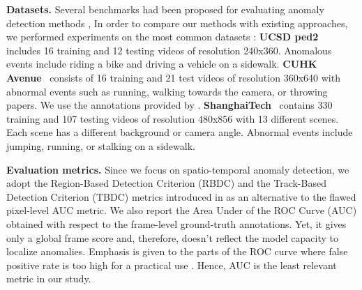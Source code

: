 \documentclass{article}
\begin{document}
\textbf{Datasets.}
Several benchmarks had been proposed for evaluating anomaly detection methods \cite{ped,avenue,shanghaitech,ucfcrime,liu,streetscene,adoc},
In order to compare our methods with existing approaches, we performed experiments on the most common datasets : 
\textbf{UCSD ped2}~\cite{ped} includes 16 training and 12 testing videos of resolution 240x360. Anomalous events include riding a bike and driving a vehicle on a sidewalk.
\textbf{CUHK Avenue}~\cite{avenue} consists of 16 training and 21 test videos of resolution 360x640  with abnormal events such as running, walking towards the camera, or throwing papers. We use the annotations provided by \cite{streetscene}.
\textbf{ShanghaiTech}~\cite{shanghaitech} contains 330 training and 107 testing videos of resolution 480x856 with 13 different scenes. Each scene has a different background or camera angle. Abnormal events include jumping, running, or stalking on a sidewalk.
\vspace{1mm}

\noindent\textbf{Evaluation metrics.} Since we focus on spatio-temporal 
anomaly detection, we
adopt the Region-Based Detection Criterion (RBDC)
and the Track-Based Detection Criterion (TBDC) 
metrics
introduced in
\cite{streetscene} as an alternative to the flawed pixel-level AUC metric. 
We also report the Area Under of the ROC Curve (AUC) obtained with respect to the frame-level ground-truth annotations. 
Yet, it gives only a global frame score and, therefore, doesn't reflect the model capacity to localize anomalies. Emphasis is given to the parts of the ROC curve  where false positive rate is too high for a practical use \cite{lobo2008auc}. Hence, AUC is the least relevant metric in our study.

\vspace{1mm}
\end{document}
